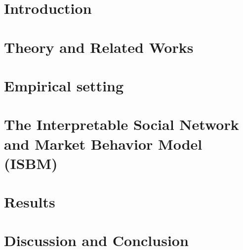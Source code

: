 \documentclass[11pt,a4paper,rorate,times]{article}
\newcommand{\hl}[1]{{\color{black}#1}}
\begin{document}

\newpage
\section{Introduction}
\label{sec:intro}


\section{Theory and Related Works}
\label{sec:relwork}


\section{Empirical setting}
\label{sec:data_desc}


\section{The Interpretable Social Network and Market Behavior Model (ISBM)}
\label{sec:method}


\section{Results}
\label{sec:results}


\section{Discussion and Conclusion}
\label{sec:conclusion}


\newpage


%

\printbibliography





%	
\end{document}
